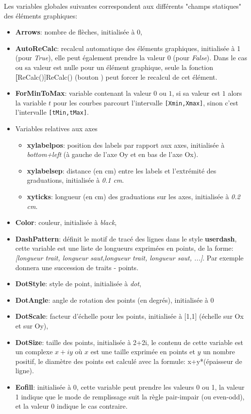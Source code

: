 Les variables globales suivantes correspondent aux différents "champs statiques" des éléments graphiques:

\begin{itemize}
     \item \textbf{Arrows}: nombre de flèches, initialisée à 0,
     \item \textbf{AutoReCalc}: recalcul automatique des éléments graphiques, initialisée à 1 (pour \textit{True}), elle peut également prendre la valeur 0 (pour \textit{False}). Dans le cas ou sa valeur est nulle pour un élément graphique, seule la fonction \textbf[ReCalc()]{ReCalc()} (bouton ) peut forcer le recalcul de cet élément.
    \item \textbf{ForMinToMax}: variable contenant la valeur $0$ ou $1$, si sa valeur est $1$ alors la variable $t$ pour les courbes parcourt l'intervalle \verb|[Xmin,Xmax]|, sinon c'est l'intervalle \verb|[tMin,tMax]|.
     \item Variables relatives aux axes
        \begin{itemize}
        \item \textbf{xylabelpos}: position des labels par rapport aux axes, initialisée à \textit{bottom+left}  (à gauche de l'axe Oy et en bas de l'axe Ox).
        \item \textbf{xylabelsep}: distance (en cm) entre les labels et l'extrémité des graduations, initialisée à \textit{0.1 cm}.
        \item \textbf{xyticks}: longueur (en cm) des graduations sur les axes, initialisée à \textit{0.2 cm}.
        \end{itemize}
     \item \textbf{Color}: couleur, initialisée à \textit{black},
    \item \textbf{DashPattern}: définit le motif de tracé des lignes dans le style \textbf{userdash}, cette variable est une liste de longueurs exprimées en points, de la forme: \textsl{[longueur trait, longueur saut,longueur trait, longueur saut, ...]}. Par exemple  donnera une succession de traits - points. 

     \item \textbf{DotStyle}: style de point, initialisée à \textit{dot},
     \item \textbf{DotAngle}: angle de rotation des points (en degrés), initialisée à 0
     \item \textbf{DotScale}: facteur d'échelle pour les points, initialisée à [1,1] (échelle sur Ox et sur Oy),
     \item \textbf{DotSize}: taille des points, initialisée à 2+2i, le contenu de cette variable est un complexe $x+iy$ où $x$ est une taille exprimée en points et $y$ un nombre positif, le diamètre des points est calculé avec la formule: x+y*(épaisseur de ligne).
     \item \textbf{Eofill}: initialisée à 0, cette variable peut prendre les valeurs 0 ou 1, la valeur 1 indique que le mode de remplissage suit la règle pair-impair (ou even-odd), et la valeur 0 indique le cas contraire.


\end{itemize}

